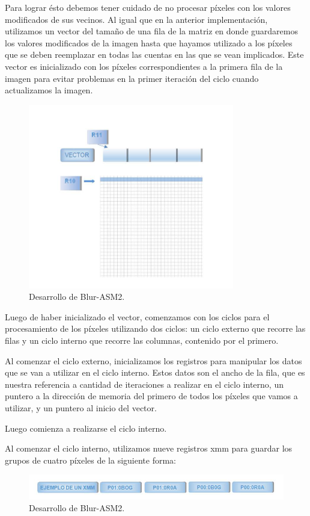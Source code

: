 Para lograr ésto debemos tener cuidado de no procesar píxeles con los valores modificados de sus vecinos. Al igual que en la anterior implementación, utilizamos un vector del tamaño de una fila de la matriz en donde guardaremos los valores modificados de la imagen hasta que hayamos utilizado a los píxeles que se deben reemplazar en todas las cuentas en las que se vean implicados.
Este vector es inicializado con los píxeles correspondientes a la primera fila de la imagen para evitar problemas en la primer iteración del ciclo cuando actualizamos la imagen.

\begin{figure}[ht!]
\centering
\includegraphics[width=90mm]{imagenes/blur/blur2-1.png}
\caption{Desarrollo de Blur-ASM2.}
\end{figure}

Luego de haber inicializado el vector, comenzamos con los ciclos para el procesamiento de los píxeles utilizando dos ciclos: un ciclo externo que recorre las filas y un ciclo interno que recorre las columnas, contenido por el primero.

Al comenzar el ciclo externo, inicializamos los registros para manipular los datos que se van a utilizar en el ciclo interno. Estos datos son el ancho de la fila, que es nuestra referencia a cantidad de iteraciones a realizar en el ciclo interno, un puntero a la dirección de memoria del primero de todos los píxeles que vamos a utilizar, y un puntero al inicio del vector.

Luego comienza a realizarse el ciclo interno.

Al comenzar el ciclo interno, utilizamos nueve registros xmm para guardar los grupos de cuatro píxeles de la siguiente forma:

\begin{figure}[ht!]
\centering
\includegraphics[width=120mm]{imagenes/blur/blur2-2.png}
\caption{Desarrollo de Blur-ASM2.}
\end{figure}

